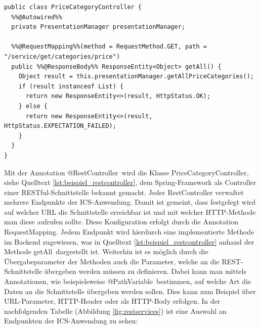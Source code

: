 \begin{lstlisting}[caption={Beispiel für einen RestController}, label={lst:beispiel_restcontroller}]
%%@RestController%%
public class PriceCategoryController {
  %%@Autowired%%
  private PresentationManager presentationManager;

  %%@RequestMapping%%(method = RequestMethod.GET, path = "/service/get/categories/price")
  public %%@ResponseBody%% ResponseEntity<Object> getAll() {
    Object result = this.presentationManager.getAllPriceCategories();
    if (result instanceof List) {
      return new ResponseEntity<>(result, HttpStatus.OK);
    } else {
      return new ResponseEntity<>(result, HttpStatus.EXPECTATION_FAILED);
    }
  }
}
\end{lstlisting}			

	Mit der Annotation \glqq @RestController\grqq \, wird die Klasse \glqq PriceCategoryController\grqq, siehe Quelltext \ref{lst:beispiel_restcontroller}, dem Spring-Framework als Controller einer \ac{REST}ful-Schnittstelle bekannt gemacht. Jeder RestController verwaltet mehrere Endpunkte der \ac{ICS}-Anwendung. Damit ist gemeint, dass festgelegt wird auf welcher URL die Schnittstelle erreichbar ist und mit welcher \ac{HTTP}-Methode man diese aufrufen sollte. Diese Konfiguration erfolgt durch die Annotation \glqq RequestMapping\grqq. Jedem Endpunkt wird hierdurch eine implementierte Methode im Backend zugewiesen, was in Quelltext \ref{lst:beispiel_restcontroller} anhand der Methode \glqq getAll\grqq \, dargestellt ist. Weiterhin ist es möglich durch die Übergabeparameter der Methoden auch die Parameter, welche an die \ac{REST}-Schnittstelle übergeben werden müssen zu definieren. Dabei kann man mittels Annotationen, wie beispielsweise \glqq @PathVariable\grqq \, bestimmen, auf welche Art die Daten an die Schnittstelle übergeben werden sollen. Dies kann zum Beispiel über URL-Parameter, \ac{HTTP}-Header oder als \ac{HTTP}-Body erfolgen. In der nachfolgenden Tabelle (Abbildung \ref{fig:restservices}) ist eine Auswahl an Endpunkten der \ac{ICS}-Anwendung zu sehen:
		

